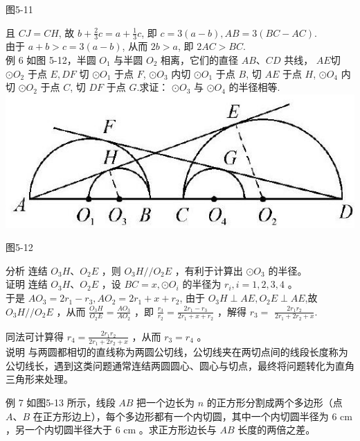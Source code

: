 \documentclass[10pt]{article}
\begin{document}
图5-11

且 $C J=C H$, 故 $b+\frac{2}{3} c=a+\frac{1}{3} c$, 即 $c=3(a-b), A B=3(B C-A C)$.\\
由于 $a+b>c=3(a-b)$, 从而 $2 b>a$, 即 $2 A C>B C$.\\
例 6 如图 5-12，半圆 $O_{1}$ 与半圆 $O_{2}$ 相离，它们的直径 $A B 、 C D$ 共线， $A E$切 $\odot O_{2}$ 于点 $E, D F$ 切 $\odot O_{1}$ 于点 $F$, $\odot O_{3}$ 内切 $\odot O_{1}$ 于点 $B$, 切 $A E$ 于点 $H$, $\odot O_{4}$ 内切 $\odot O_{2}$ 于点 $C$, 切 $D F$ 于点 $G$.求证： $\odot O_{3}$ 与 $\odot O_{4}$ 的半径相等.\\
\includegraphics[max width=\textwidth, center]{2024_10_30_66b8e5e701da2093c133g-038}

图5-12

分析 连结 $O_{3} H 、 O_{2} E$ ，则 $O_{3} H / / O_{2} E$ ，有利于计算出 $\odot O_{3}$ 的半径。\\
证明 连结 $O_{3} H 、 O_{2} E$ ，设 $B C=x, \odot O_{i}$ 的半径为 $r_{i}, i=1,2,3,4$ 。\\
于是 $A O_{3}=2 r_{1}-r_{3}, A O_{2}=2 r_{1}+x+r_{2}$, 由于 $O_{3} H \perp A E, O_{2} E \perp A E$,故 $O_{3} H / / O_{2} E$ ，从而 $\frac{O_{3} H}{O_{2} E}=\frac{A O_{3}}{A O_{2}}$ ，即 $\frac{r_{3}}{r_{2}}=\frac{2 r_{1}-r_{3}}{2 r_{1}+x+r_{2}}$ ，解得 $r_{3}=$ $\frac{2 r_{1} r_{2}}{2 r_{1}+2 r_{2}+x}$.

同法可计算得 $r_{4}=\frac{2 r_{1} r_{2}}{2 r_{1}+2 r_{2}+x}$ ，从而 $r_{3}=r_{4}$ 。\\
说明 与两圆都相切的直线称为两圆公切线，公切线夹在两切点间的线段长度称为公切线长，遇到这类问题通常连结两圆圆心、圆心与切点，最终将问题转化为直角三角形来处理。

例 7 如图5-13 所示，线段 $A B$ 把一个边长为 $n$ 的正方形分割成两个多边形（点 $A 、 B$ 在正方形边上），每个多边形都有一个内切圆，其中一个内切圆半径为 6 cm ，另一个内切圆半径大于 6 cm 。求正方形边长与 $A B$ 长度的两倍之差。
\end{document}
